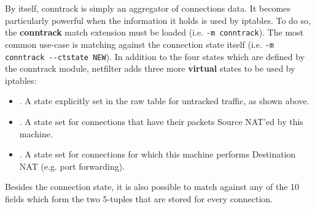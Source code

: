 By itself, conntrack is simply an aggregator of connections data.  It becomes
particularly powerful when the information it holds is used by iptables.  To do
so, the \textbf{conntrack} match extension must be loaded (i.e.
\lstinline{-m conntrack}).  The most common use-case is matching against the
connection state itself (i.e. \lstinline{-m conntrack --ctstate NEW}).  In
addition to the four states which are defined by the conntrack module,
netfilter adds three more \textbf{virtual} states to be used by iptables:
\begin{itemize}
  \item \UNTRACKED.  A state explicitly set in the raw table for untracked
    traffic, as shown above.
  \item \SNAT.  A state set for connections that have their packets Source
    NAT'ed by this machine.
  \item \DNAT.  A state set for connections for which this machine performs
    Destination NAT (e.g. port forwarding).
\end{itemize}

Besides the connection state, it is also possible to match against any of the
10 fields which form the two 5-tuples that are stored for every connection.
